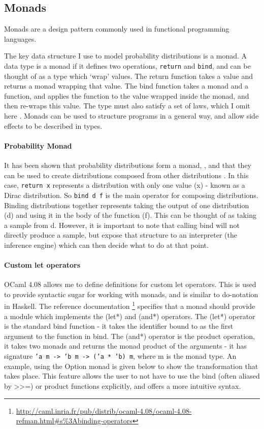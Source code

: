 \documentclass[sigconf]{acmart}
\begin{document}
\subsection{Monads}
Monads are a design pattern commonly used in functional programming languages.

The key data structure I use to model probability distributions is a monad. A data type is a monad if it defines two operations, \texttt{return} and \texttt{bind}, and can be thought of as a type which `wrap' values. The return function takes a value and returns a monad wrapping that value. The bind function takes a monad and a function, and applies the function to the value wrapped inside the monad, and then re-wraps this value. The type must also satisfy a set of laws, which I omit here \cite{wadler1990comprehending}. Monads can be used to structure programs in a general way, and allow side effects to be described in types.

\paragraph{Probability Monad} \label{sec:prep-monad}
It has been shown that probability distributions form a monad, \cite{giry1982categorical, jones1989probabilistic}, and that they can be used to create distributions composed from other distributions \cite{ramsey2002stochastic}. In this case, \texttt{return x} represents a distribution with only one value (x) - known as a Dirac distribution. So \texttt{bind d f} is the main operator for composing distributions. Binding distributions together represents taking the output of one distribution (d) and using it in the body of the function (f). This can be thought of as taking a sample from d. However, it is important to note that calling bind will not directly produce a sample, but expose that structure to an interpreter (the inference engine) which can then decide what to do at that point.

\paragraph{Custom let operators}
OCaml 4.08 allows me to define definitions for custom let operators. This is used to provide syntactic sugar for working with monads, and is similar to do-notation in Haskell. The reference documentation \footnote{\url{http://caml.inria.fr/pub/distrib/ocaml-4.08/ocaml-4.08-refman.html\#s\%3Abinding-operators}} specifies that a monad should provide a module which implements the (let*) and (and*) operators. The (let*) operator is the standard bind function - it takes the identifier bound to as the first argument to the function in bind. The (and*) operator is the product operation, it takes two monads and returns the monad product of the arguments - it has signature \texttt{'a m -> 'b m -> ('a * 'b) m}, where m is the monad type. An example, using the Option monad is given below to show the transformation that takes place. This feature allows the user to not have to use the bind (often aliased by >>=) or product functions explicitly, and offers a more intuitive syntax.
\end{document}
